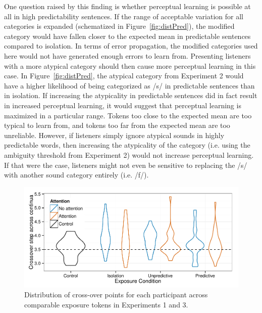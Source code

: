 One question raised by this finding is whether perceptual learning is possible at all in high predictability sentences.
If the range of acceptable variation for all categories is expanded (schematized in Figure~\ref{fig:distPred}), the modified category would have fallen closer to the expected mean in predictable sentences compared to isolation.
In terms of error propagation, the modified categories used here would not have generated enough errors to learn from.
Presenting listeners with a more atypical category should then cause more perceptual learning in this case.
In Figure~\ref{fig:distPred}, the atypical category from Experiment 2 would have a higher likelihood of being categorized as /s/ in predictable sentences than in isolation.
If increasing the atypicality in predictable sentences did in fact result in increased perceptual learning, it would suggest that perceptual learning is maximized in a particular range.
Tokens too close to the expected mean are too typical to learn from, and tokens too far from the expected mean are too unreliable.
However, if listeners simply ignore atypical sounds in highly predictable words, then increasing the atypicality of the category (i.e. using the ambiguity threshold from Experiment 2) would not increase perceptual learning.
If that were the case, listeners might not even be sensitive to replacing the /s/ with another sound category entirely (i.e. /f/).


\begin{figure}[!ht]
\centering
\caption{Distribution of cross-over points for each participant across comparable exposure tokens in Experiments 1 and 3.}
\label{fig:exp13xoverdist}
\begin{center}
\includegraphics[width=\textwidth]{graphs/exp13_xoverdist}
\end{center}
\end{figure}

